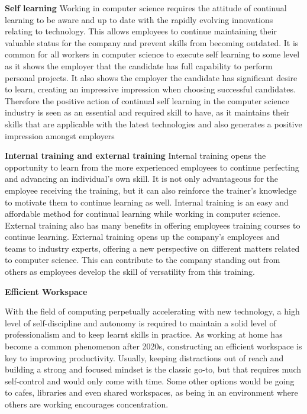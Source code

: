 \documentclass[a4paper, 11pt]{report}
\begin{document}
\textbf{Self learning}
Working in computer science requires the attitude of continual learning to be aware and up to date with the rapidly evolving innovations relating to technology. This allows employees to continue maintaining their valuable status for the company and prevent skills from becoming outdated. It is common for all workers in computer science to execute self learning to some level as it shows the employer that the candidate has full capability to perform personal projects. It also shows the employer the candidate has significant desire to learn, creating an impressive impression when choosing successful candidates. Therefore the positive action of continual self learning in the computer science industry is seen as an essential and required skill to have, as it maintains their skills that are applicable with the latest technologies and also generates a positive impression amongst employers

\textbf{Internal training and external training}
Internal training opens the opportunity to learn from the more experienced employees to continue perfecting and advancing an individual's own skill. It is not only advantageous for the employee receiving the training, but it can also reinforce the trainer's knowledge to motivate them to continue learning as well. Internal training is an easy and affordable method for continual learning while working in computer science. External training also has many benefits in offering employees training courses to continue learning. 
External training opens up the company’s employees and teams to industry experts, offering a new perspective on different matters related to computer science. This can contribute to the company standing out from others as employees develop the skill of versatility from this training. 

\textbf{Efficient Workspace}

With the field of computing perpetually accelerating with new technology, a high level of self-discipline and autonomy is required to maintain a solid level of professionalism and to keep learnt skills in practice. As working at home has become a common phenomenon after 2020s, constructing an efficient workspace is key to improving productivity. Usually, keeping distractions out of reach and building a strong and focused mindset is the classic go-to, but that requires much self-control and would only come with time. Some other options would be going to cafes, libraries and even shared workspaces, as being in an environment where others are working encourages concentration.
\end{document}
